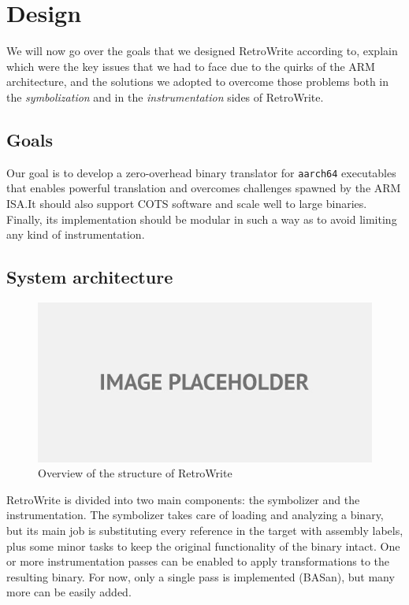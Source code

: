 \documentclass[a4paper,11pt,oneside]{report}
\newcommand{\sysname}{RetroWrite\xspace}
\begin{document}
\chapter{Design}


We will now go over the goals that we designed \sysname according to, explain
which were the key issues that we had to face due to the quirks of the ARM
architecture, and the solutions we adopted to overcome those problems both in
the \emph{symbolization} and in the \emph{instrumentation} sides of \sysname.


\section{Goals}

Our goal is to develop a zero-overhead binary translator for \texttt{aarch64} 
executables that enables powerful translation and overcomes challenges spawned 
by the ARM ISA.\@ It should also support COTS software and scale well to large 
binaries. Finally, its implementation should be modular in such a way as to 
avoid limiting any kind of instrumentation.


\section{System architecture}

\begin{figure}[h]
\includegraphics[width=15cm]{symbolizer.jpg}
\centering
\caption{Overview of the structure of \sysname}
\end{figure}

\sysname is divided into two main components: the symbolizer and the 
instrumentation.  The symbolizer takes care of loading and analyzing a binary, 
but its main job is substituting every reference in the target with assembly 
labels, plus some minor tasks to keep the original functionality of the binary 
intact. One or more instrumentation passes can be enabled to apply 
transformations to the resulting binary. For now, only a single pass is 
implemented (BASan), but many more can be easily added.
\end{document}
